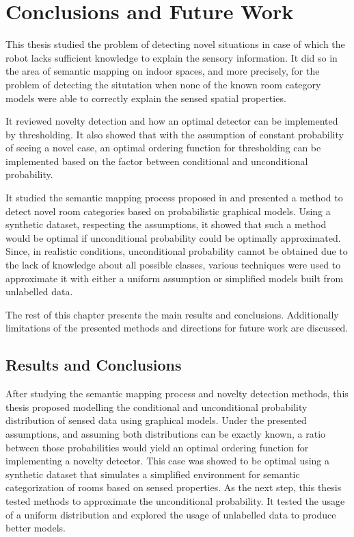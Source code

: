 \chapter{Conclusions and Future Work}\label{chap:conclusions}

This thesis studied the problem of detecting novel situations in case of which the robot
lacks sufficient knowledge to explain the sensory information. It did so in the area of 
semantic mapping on indoor spaces, and more precisely, for the problem of detecting the situtation when
none of the known room category models were able to correctly explain the sensed spatial properties.

It reviewed novelty detection and how an optimal detector can be implemented by
thresholding. It also showed that with the assumption of constant probability of seeing a
novel case, an optimal ordering function for thresholding can be implemented based on
the factor between conditional and unconditional probability.

It studied the semantic mapping process proposed in \cite{pronobis2011semmap} and presented 
a method to detect novel room categories based on probabilistic graphical models.
Using a synthetic dataset, respecting the assumptions, it showed that such a method would be 
optimal if unconditional probability could be optimally approximated. Since, in realistic conditions, 
unconditional probability cannot be obtained due to the lack of knowledge about all possible classes, various
techniques were used to approximate it with either a uniform assumption or simplified models built from 
unlabelled data.

The rest of this chapter presents the main results and conclusions. Additionally limitations of the 
presented methods and directions for future work are discussed.


\section{Results and Conclusions}

After studying the semantic mapping process and novelty detection methods, this
thesis proposed modelling the conditional and unconditional probability distribution of sensed
data using graphical models. Under the presented assumptions, and assuming both distributions can be 
exactly known, a ratio between those probabilities would yield an optimal ordering function for implementing a
novelty detector. This case was showed to be optimal using a synthetic dataset that simulates a simplified
environment for semantic categorization of rooms based on sensed properties.
As the next step, this thesis tested methods to approximate the unconditional probability. 
It tested the usage of a uniform distribution and explored the usage of unlabelled data to 
produce better models.

